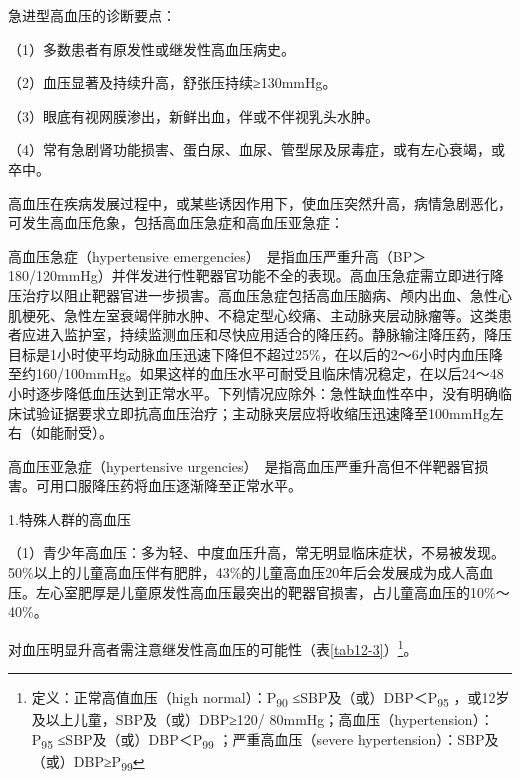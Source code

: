 急进型高血压的诊断要点：

（1）多数患者有原发性或继发性高血压病史。

（2）血压显著及持续升高，舒张压持续≥130mmHg。

（3）眼底有视网膜渗出，新鲜出血，伴或不伴视乳头水肿。

（4）常有急剧肾功能损害、蛋白尿、血尿、管型尿及尿毒症，或有左心衰竭，或卒中。

高血压在疾病发展过程中，或某些诱因作用下，使血压突然升高，病情急剧恶化，可发生高血压危象，包括高血压急症和高血压亚急症：

高血压急症（hypertensive
emergencies）　是指血压严重升高（BP＞180/120mmHg）并伴发进行性靶器官功能不全的表现。高血压急症需立即进行降压治疗以阻止靶器官进一步损害。高血压急症包括高血压脑病、颅内出血、急性心肌梗死、急性左室衰竭伴肺水肿、不稳定型心绞痛、主动脉夹层动脉瘤等。这类患者应进入监护室，持续监测血压和尽快应用适合的降压药。静脉输注降压药，降压目标是1小时使平均动脉血压迅速下降但不超过25\%，在以后的2～6小时内血压降至约160/100mmHg。如果这样的血压水平可耐受且临床情况稳定，在以后24～48小时逐步降低血压达到正常水平。下列情况应除外：急性缺血性卒中，没有明确临床试验证据要求立即抗高血压治疗；主动脉夹层应将收缩压迅速降至100mmHg左右（如能耐受）。

高血压亚急症（hypertensive
urgencies）　是指高血压严重升高但不伴靶器官损害。可用口服降压药将血压逐渐降至正常水平。

1.特殊人群的高血压

（1）青少年高血压：多为轻、中度血压升高，常无明显临床症状，不易被发现。50\%以上的儿童高血压伴有肥胖，43\%的儿童高血压20年后会发展成为成人高血压。左心室肥厚是儿童原发性高血压最突出的靶器官损害，占儿童高血压的10\%～40\%。

对血压明显升高者需注意继发性高血压的可能性（表\ref{tab12-3}）\footnote{定义：正常高值血压（high normal）：P\textsubscript{90}
≤SBP及（或）DBP＜P\textsubscript{95}
，或12岁及以上儿童，SBP及（或）DBP≥120/
80mmHg；高血压（hypertension）：P\textsubscript{95}
≤SBP及（或）DBP＜P\textsubscript{99} ；严重高血压（severe
hypertension）：SBP及（或）DBP≥P\textsubscript{99}}。

